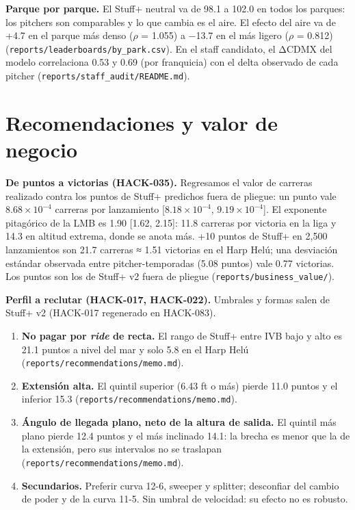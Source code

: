 \documentclass[
  english,
  spanish,
  10pt,
  letterpaper,
]{article}
\providecommand{\tightlist}{%
  \setlength{\itemsep}{0pt}\setlength{\parskip}{0pt}}
\let\diablosTT\texttt
\renewcommand{\texttt}[1]{{\color{gris}\fontsize{8.2}{10}\selectfont\diablosTT{#1}}}
\begin{document}
\textbf{Parque por parque.} El Stuff+ neutral va de 98.1 a 102.0 en
todos los parques: los pitchers son comparables y lo que cambia es el
aire. El efecto del aire va de +4.7 en el parque más denso (\(\rho\) =
1.055) a −13.7 en el más ligero (\(\rho\) = 0.812)
(\texttt{reports/leaderboards/by\_park.csv}). En el staff candidato, el
ΔCDMX del modelo correlaciona 0.53 y 0.69 (por franquicia) con el delta
observado de cada pitcher (\texttt{reports/staff\_audit/README.md}).

\section{Recomendaciones y valor de
negocio}\label{recomendaciones-y-valor-de-negocio}

\textbf{De puntos a victorias (HACK-035).} Regresamos el valor de
carreras realizado contra los puntos de Stuff+ predichos fuera de
pliegue: un punto vale \(8.68\times10^{-4}\) carreras por lanzamiento
{[}\(8.18\times10^{-4}\), \(9.19\times10^{-4}\){]}. El exponente
pitagórico de la LMB es 1.90 {[}1.62, 2.15{]}: 11.8 carreras por
victoria en la liga y 14.3 en altitud extrema, donde se anota más. +10
puntos de Stuff+ en 2,500 lanzamientos son 21.7 carreras ≈ 1.51
victorias en el Harp Helú; una desviación estándar observada entre
pitcher-temporadas (5.08 puntos) vale 0.77 victorias. Los puntos son los
de Stuff+ v2 fuera de pliegue (\texttt{reports/business\_value/}).

\textbf{Perfil a reclutar (HACK-017, HACK-022).} Umbrales y formas salen
de Stuff+ v2 (HACK-017 regenerado en HACK-083).

\begin{enumerate}
\def\labelenumi{\arabic{enumi}.}
\tightlist
\item
  \textbf{No pagar por \emph{ride} de recta.} El rango de Stuff+ entre
  IVB bajo y alto es 21.1 puntos a nivel del mar y solo 5.8 en el Harp
  Helú (\texttt{reports/recommendations/memo.md}).
\item
  \textbf{Extensión alta.} El quintil superior (6.43 ft o más) pierde
  11.0 puntos y el inferior 15.3
  (\texttt{reports/recommendations/memo.md}).
\item
  \textbf{Ángulo de llegada plano, neto de la altura de salida.} El
  quintil más plano pierde 12.4 puntos y el más inclinado 14.1: la
  brecha es menor que la de la extensión, pero sus intervalos no se
  traslapan (\texttt{reports/recommendations/memo.md}).
\item
  \textbf{Secundarios.} Preferir curva 12-6, sweeper y splitter;
  desconfiar del cambio de poder y de la curva 11-5. Sin umbral de
  velocidad: su efecto no es robusto.
\end{enumerate}
\end{document}

